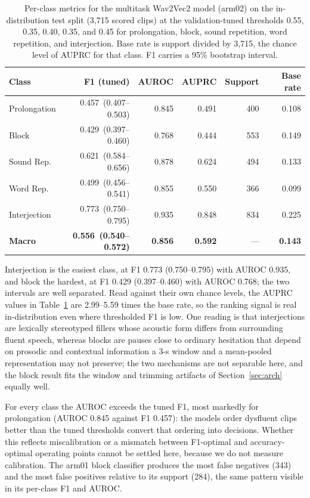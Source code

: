 \documentclass[a4paper,orivec]{llncs}
\newcommand{\ci}[1]{{\scriptsize\,(#1)}}
\begin{document}
\begin{table}[!htbp]
\caption{Per-class metrics for the multitask Wav2Vec2 model (arm02) on the
in-distribution test split (3{,}715 scored clips) at the validation-tuned
thresholds 0.55, 0.35, 0.40, 0.35, and 0.45 for prolongation, block, sound
repetition, word repetition, and interjection. Base rate is support divided by
3{,}715, the chance level of AUPRC for that class. F1 carries a 95\% bootstrap
interval.}
\label{tab:perclass}
\centering
\footnotesize
\setlength{\tabcolsep}{3pt}
\renewcommand{\arraystretch}{0.9}
\begin{tabular}{lrrrrr}
\hline
Class & F1 (tuned) & AUROC & AUPRC & Support & Base rate\\
\hline
Prolongation & 0.457 \ci{0.407--0.503} & 0.845 & 0.491 & 400 & 0.108\\
Block & 0.429 \ci{0.397--0.460} & 0.768 & 0.444 & 553 & 0.149\\
Sound Rep. & 0.621 \ci{0.584--0.656} & 0.878 & 0.624 & 494 & 0.133\\
Word Rep. & 0.499 \ci{0.456--0.541} & 0.855 & 0.550 & 366 & 0.099\\
Interjection & 0.773 \ci{0.750--0.795} & 0.935 & 0.848 & 834 & 0.225\\
\hline
\textbf{Macro} & \textbf{0.556 \ci{0.540--0.572}} & \textbf{0.856} & \textbf{0.592} & --- & \textbf{0.143}\\
\hline
\end{tabular}
\end{table}

Interjection is the easiest class, at F1 0.773 (0.750--0.795) with AUROC 0.935,
and block the hardest, at F1 0.429 (0.397--0.460) with AUROC 0.768; the two
intervals are well separated. Read against their own chance levels, the AUPRC
values in Table~\ref{tab:perclass} are 2.99--5.59 times the base rate, so the
ranking signal is real in-distribution even where thresholded F1 is low. One
reading is that interjections are lexically stereotyped fillers whose acoustic
form differs from surrounding fluent speech, whereas blocks are pauses close to
ordinary hesitation that depend on prosodic and contextual information a 3-s
window and a mean-pooled representation may not preserve; the two mechanisms are
not separable here, and the block result fits the window and trimming artifacts of
Section~\ref{sec:arch} equally well.

For every class the AUROC exceeds the tuned F1, most markedly for prolongation
(AUROC 0.845 against F1 0.457): the models order dysfluent clips better than the
tuned thresholds convert that ordering into decisions. Whether this reflects
miscalibration or a mismatch between F1-optimal and accuracy-optimal operating
points cannot be settled here, because we do not measure calibration. The arm01
block classifier produces the most false negatives (343) and the most false
positives relative to its support (284), the same pattern visible in its per-class
F1 and AUROC.
\end{document}
